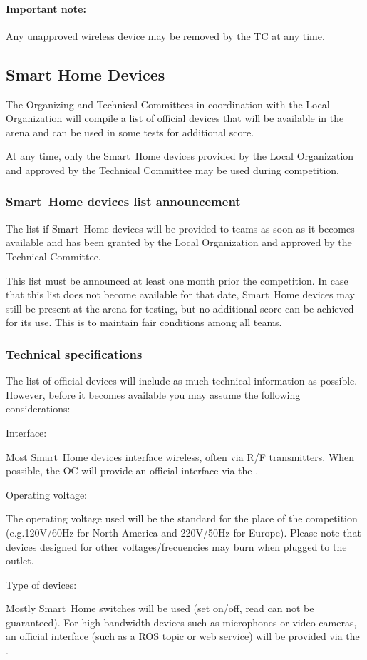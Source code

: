 \paragraph*{Important note:} Any unapproved wireless device may be removed by the TC at any time.

\subsection{Smart Home Devices}
\label{rule:smarthomedevices}

The Organizing and Technical Committees in coordination with the Local Organization will compile a list of  official devices that will be available in the arena and can be used in some tests for additional score.

At any time, only the Smart~Home devices provided by the Local Organization and approved by the Technical Committee may be used during competition.

\subsubsection{Smart~Home devices list announcement}
The list if Smart~Home devices will be provided to teams as soon as it becomes available and has been granted by the Local Organization and approved by the Technical Committee. 

This list must be announced at least one month prior the competition. In case that this list does not become available for that date, Smart~Home devices may still be present at the arena for testing, but no additional score can be achieved for its use. This is to maintain fair conditions among all teams.

\subsubsection{Technical specifications}
The list of  official devices will include as much technical information as possible. However, before it becomes available you may assume the following considerations:

\begin{enumerate}
	{\bf\item Interface:} Most Smart~Home devices interface wireless, often via R/F transmitters. When possible, the OC will provide an official interface via the .
	{\bf\item Operating voltage:} The operating voltage used will be the standard for the place of the competition (e.g.120V/60Hz for North America and 220V/50Hz for Europe). Please note that devices designed for other voltages/frecuencies may burn when plugged to the outlet.
	{\bf\item Type of devices:} Mostly Smart~Home switches will be used (set on/off, read can not be guaranteed). For high bandwidth devices such as microphones or video cameras, an official interface (such as a ROS topic or web service) will be provided via the .
\end{enumerate}

